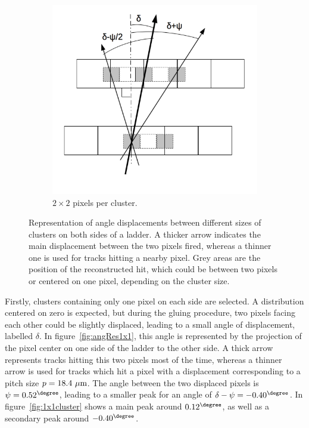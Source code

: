 \begin{figure}[!tbh]
      \begin{subfigure}[t]{0.45\textwidth}
        \centering
        \includegraphics[width = \textwidth]{Pictures/deformation/cluster2x2_jerome.png}
        \caption{$2 \times 2$ pixels per cluster.}
        \label{fig:2x2clusters}
      \end{subfigure}
      \caption{Representation of angle displacements between different sizes of clusters on both sides of a ladder. A thicker arrow indicates the main displacement between the two pixels fired, whereas a thinner one is used for tracks hitting a nearby pixel. Grey areas are the position of the reconstructed hit, which could be between two pixels or centered on one pixel, depending on the cluster size.}
      \label{fig:clusterSize}
   \end{figure}

   Firstly, clusters containing only one pixel on each side are selected.
   A distribution centered on zero is expected, but during the gluing procedure, two pixels facing each other could be slightly displaced, leading to a small angle of displacement, labelled $\delta$.
   In figure~\ref{fig:angRes1x1}, this angle is represented by the projection of the pixel center on one side of the ladder to the other side.
   A thick arrow represents tracks hitting this two pixels most of the time, whereas a thinner arrow is used for tracks which hit a pixel with a displacement corresponding to a pitch size $p = 18.4~\rm{\mu m}$.
   The angle between the two displaced pixels is $\psi = 0.52^{\degree}$, leading to a smaller peak for an angle of $\delta - \psi = -0.40^{\degree}$.
   In figure~\ref{fig:1x1cluster} shows a main peak around $0.12^{\degree}$, as well as a secondary peak around $-0.40^{\degree}$.
  
